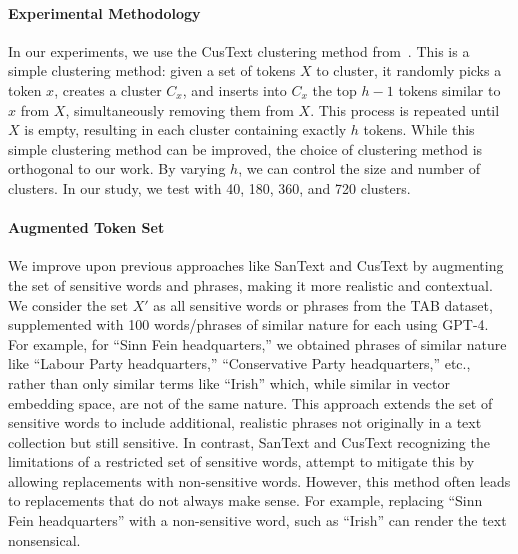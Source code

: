 \documentclass[11pt]{article}
\begin{document}
\paragraph{Experimental Methodology}
In our experiments, we use the CusText clustering method from~\cite{chen2023customized}. This is a simple clustering method: given a set of tokens \(X\) to cluster, it randomly picks a token \(x\), creates a cluster \(C_x\), and inserts into \(C_x\) the top \(h-1\) tokens similar to \(x\) from \(X\), simultaneously removing them from \(X\). This process is repeated until \(X\) is empty, resulting in each cluster containing exactly \(h\) tokens. While this simple clustering method can be improved, the choice of clustering method is orthogonal to our work. By varying \(h\), we can control the size and number of clusters. In our study, we test with 40, 180, 360, and 720 clusters.

\paragraph{Augmented Token Set} We  improve upon previous approaches like SanText and CusText by augmenting the set of sensitive words and phrases, making it more realistic and contextual. We consider the set $X'$ as all sensitive words or phrases from the TAB dataset, supplemented with 100 words/phrases of similar nature for each using GPT-4. For example, for ``Sinn Fein headquarters,'' we obtained phrases of similar nature like ``Labour Party headquarters,'' ``Conservative Party headquarters,'' etc., rather than only similar terms like ``Irish'' which, while similar in vector embedding space, are not of the same nature. This approach extends the set of sensitive words to include additional, realistic phrases not originally in a text collection but still sensitive.
In contrast, SanText and CusText recognizing the limitations of a restricted set of sensitive words, attempt to mitigate this by allowing replacements with non-sensitive words. 
However, this method often leads to replacements that do not always make sense. 
For example, replacing ``Sinn Fein headquarters'' with a non-sensitive word, such as ``Irish'' 
can render the text nonsensical. 
\end{document}
